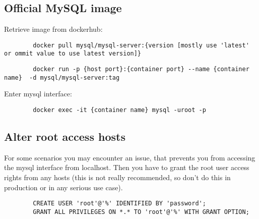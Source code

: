\documentclass{article}
\begin{document}
	\subsection{Official MySQL image}
	
	Retrieve image from dockerhub:
	
	\begin{lstlisting}
		docker pull mysql/mysql-server:{version [mostly use 'latest' or ommit value to use latest version]}
	\end{lstlisting}
	
	\begin{lstlisting}
		docker run -p {host port}:{container port} --name {container name}  -d mysql/mysql-server:tag
	\end{lstlisting}
	
	Enter mysql interface:
	\begin{lstlisting}
		docker exec -it {container name} mysql -uroot -p
	\end{lstlisting}

	\subsection{Alter root access hosts}
	For some scenarios you may encounter an issue, that prevents you from accessing the mysql interface from localhost.  Then you have to grant the root user access rights from any hosts (this is not really recommended, so don't do this in production or in any serious use case).\\
	\begin{lstlisting}
		CREATE USER 'root'@'%' IDENTIFIED BY 'password';
		GRANT ALL PRIVILEGES ON *.* TO 'root'@'%' WITH GRANT OPTION;
	\end{lstlisting}
\end{document}
